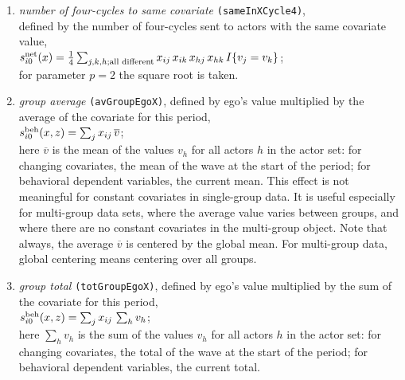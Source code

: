 \documentclass[a4paper,fleqn,11pt]{article}
\newcommand{\+}{\, + \,}
\newcommand{\vit}{\theenumi}
\newcounter{savenumi}
\begin{document}
\begin{enumerate}
 \item
 {\em number of four-cycles to same covariate}  \texttt{(sameInXCycle4)},\\
 defined by the number of four-cycles sent to actors with the
 same covariate value,  \\[0.3em]
 $s^{\rm net}_{i\vit}(x) =  \frac14 \sum_{j,k,h; \text{all different}}
            x_{ij}\, x_{ik}\, x_{hj}\, x_{hk}\,I\{v_j = v_k\} $;\\[0.3em]
 for parameter $p=2$ the square root is taken.

 \item {\em group average} \texttt{(avGroupEgoX)}, defined by ego's value multiplied by the
 average of the covariate for this period,  \\
 $s^{\rm beh}_{i\vit}(x, z) =  \sum_j x_{ij} \, \overline {v}  $;\\
 here $\overline {v}$ is the mean of the values $v_{h}$ for all actors $h$
 in the actor set: for changing covariates, the mean of the wave at the
 start of the period; for behavioral dependent variables,
 the current mean.
 This effect is not meaningful for constant covariates in single-group data.
 It is useful especially for multi-group data sets, where the average value
 varies between groups, and where there are no constant covariates
 in the multi-group object.
 Note that always, the average $\overline {v} $ is centered by the global mean.
 For multi-group data, global centering means centering over all groups.

 \item {\em group total} \texttt{(totGroupEgoX)}, defined by ego's value multiplied by the
 sum of the covariate for this period,  \\
 $s^{\rm beh}_{i\vit}(x, z) =  \sum_j x_{ij} \, \sum_h{v_h}  $;\\
 here $\sum_h{v_h} $ is the sum of the values $v_{h}$ for all actors $h$
 in the actor set: for changing covariates, the total of the wave at the
 start of the period; for behavioral dependent variables,
 the current total.

\setcounter{savenumi}{\value{enumi}}

\end{enumerate}
\end{document}
